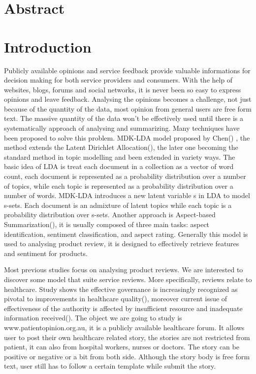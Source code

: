 \documentclass[11pt,twoside]{report}
\begin{document}
\chapter*{Abstract}

\chapter{Introduction}



Publicly available opinions and service feedback provide valuable informations for decision making for both service providers and consumers. With the help of websites, blogs, forums and social networks, it is never been so easy to express opinions and leave feedback. Analysing the opinions becomes a challenge, not just because of the quantity of the data, most opinion from general users are free form text. The massive quantity of the data won’t be effectively used until there is a systematically approach of analysing and summarizing. Many techniques have been proposed to solve this problem. MDK-LDA model proposed by Chen(\cite{ref24}) , the method extends the Latent Dirichlet Allocation(\cite{ref25}), the later one becoming the standard method in topic modelling and been extended in variety ways. The basic idea of LDA is treat each document in a collection as a vector of word count, each document is represented as a probability distribution over a number of topics, while each topic is represented as a probability distribution over a number of words. MDK-LDA introduces a new latent variable s in LDA to model s-sets. Each document is an admixture of latent topics while each topic is a probability distribution over s-sets. Another approach is Aspect-based Summarization(\cite{ref11}), it is usually composed of three main tasks: aspect identification, sentiment classification, and aspect rating. Generally this model is used to analysing product review, it is designed to effectively retrieve features and sentiment for products.

Most previous studies focus on analysing product reviews. We are interested to discover some model that suite service reviews. More specifically, reviews relate to healthcare. Study shows the effective governance is increasingly recognized as pivotal to improvements in healthcare quality(\cite{ref6}), moreover current issue of effectiveness of the authority is affected by insufficient resource and inadequate information received(\cite{ref5}).
The object we are going to study is www.patientopinion.org.au, it is a publicly available healthcare forum. It allows user to post their own healthcare related story, the stories are not restricted from patient, it can also from hospital workers, nurses or doctors. The story can be positive or negative or a bit from both side. Although the story body is free form text, user still has to follow a certain template while submit the story.
\end{document}
